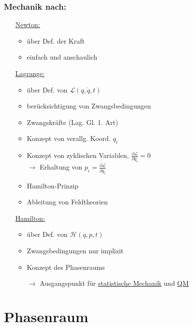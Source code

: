 \documentclass[titlepage,12pt,a4paper,ngerman]{report}
\newcommand{\lag}{\mathcal{L}}
\newcommand{\ham}{\mathcal{H}}
\begin{document}
\subsubsection{Mechanik nach:}
\begin{itemize}
	\item[\underline{Newton:}] \begin{itemize}
		\item über Def. der Kraft
		\item einfach und anschaulich
	\end{itemize}
	\item[\underline{Lagrange:}] \begin{itemize}
		\item über Def. von $ \lag(q,\dot{q},t) $
		\item  berücksichtigung von Zwangsbedingungen
		\item Zwangskräfte (Lag. Gl. 1. Art)
		\item Konzept von verallg. Koord. $ q_i $
		\item Konzept von zyklischen Variablen, $ \frac{\partial \lag}{\partial q_i} = 0 $\\
		$ \rightarrow $ Erhaltung von $ p_i = \frac{\partial \lag}{\partial \dot q_i} $
		\item Hamilton-Prinzip
		\item Ableitung von Feldtheorien
	\end{itemize}
	\item[\underline{Hamilton:}] \begin{itemize}
		\item über Def. von $ \ham(q,p,t) $
		\item Zwangsbedingungen nur implizit
		\item Konzept des Phasenraums
		\item[$ \rightarrow $] Ausgangspunkt für \underline{statistische Mechanik} und \underline{QM}
	\end{itemize}
\end{itemize}
\section{Phasenraum}

\end{document}
